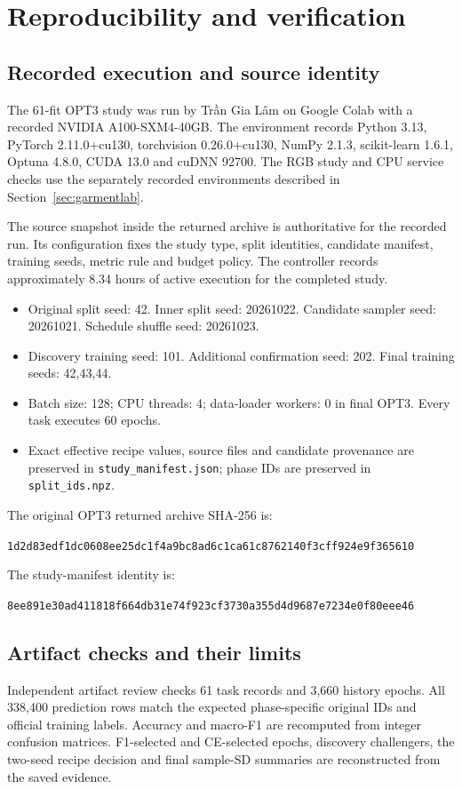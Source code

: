 \clearpage
\section{Reproducibility and verification}
\subsection{Recorded execution and source identity}
The 61-fit OPT3 study was run by Trần Gia Lâm on Google Colab with a recorded NVIDIA A100-SXM4-40GB. The environment records Python 3.13, PyTorch 2.11.0+cu130, torchvision 0.26.0+cu130, NumPy 2.1.3, scikit-learn 1.6.1, Optuna 4.8.0, CUDA 13.0 and cuDNN 92700. The RGB study and CPU service checks use the separately recorded environments described in Section~\ref{sec:garmentlab}.

The source snapshot inside the returned archive is authoritative for the recorded run. Its configuration fixes the study type, split identities, candidate manifest, training seeds, metric rule and budget policy. The controller records approximately 8.34 hours of active execution for the completed study.

\begin{itemize}
\item Original split seed: 42. Inner split seed: 20261022. Candidate sampler seed: 20261021. Schedule shuffle seed: 20261023.
\item Discovery training seed: 101. Additional confirmation seed: 202. Final training seeds: 42,43,44.
\item Batch size: 128; CPU threads: 4; data-loader workers: 0 in final OPT3. Every task executes 60 epochs.
\item Exact effective recipe values, source files and candidate provenance are preserved in \nolinkurl{study_manifest.json}; phase IDs are preserved in \nolinkurl{split_ids.npz}.
\end{itemize}

The original OPT3 returned archive SHA-256 is:\par
{\scriptsize\texttt{1d2d83edf1dc0608ee25dc1f4a9bc8ad6c1ca61c8762140f3cff924e9f365610}}\par

The study-manifest identity is:\par
{\scriptsize\texttt{8ee891e30ad411818f664db31e74f923cf3730a355d4d9687e7234e0f80eee46}}\par

\subsection{Artifact checks and their limits}
Independent artifact review checks 61 task records and 3,660 history epochs. All 338,400 prediction rows match the expected phase-specific original IDs and official training labels. Accuracy and macro-F1 are recomputed from integer confusion matrices. F1-selected and CE-selected epochs, discovery challengers, the two-seed recipe decision and final sample-SD summaries are reconstructed from the saved evidence.

